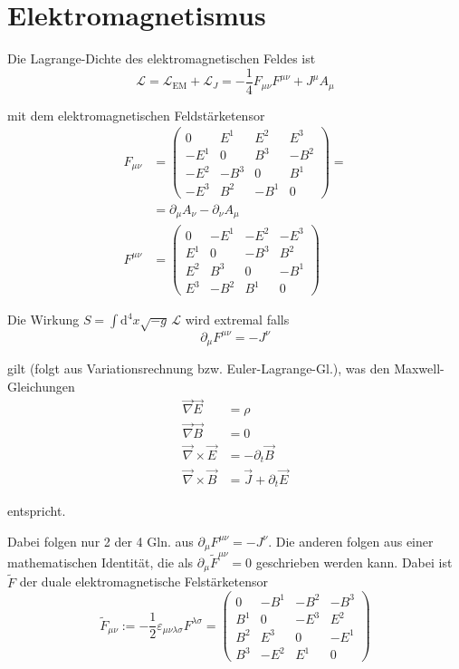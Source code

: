 \documentclass{article}
\newcommand{\diff}{\mathrm{d}}
\begin{document}
\newpage


\section{Elektromagnetismus}
Die Lagrange-Dichte des elektromagnetischen Feldes ist
	\begin{equation}
		\mathcal{L} = \mathcal{L}_\text{EM} + \mathcal{L}_J = -\frac{1}{4} F_{\mu\nu}F^{\mu\nu} + J^\mu A_\mu
	\end{equation}

mit dem elektromagnetischen Feldstärketensor
	\begin{align}
		F_{\mu\nu} &= 
		\begin{pmatrix}
			0 & E^1 & E^2 & E^3 \\
			-E^1 & 0 & B^3 & -B^2 \\
			-E^2 & -B^3 & 0 & B^1 \\
			-E^3 & B^2 & -B^1 & 0
		\end{pmatrix} = \\
		&= \partial_\mu A_\nu - \partial_\nu A_\mu \\
		F^{\mu\nu} &= 
		\begin{pmatrix}
			0 & -E^1 & -E^2 & -E^3 \\
			E^1 & 0 & -B^3 & B^2 \\
			E^2 & B^3 & 0 & -B^1 \\
			E^3 & -B^2 & B^1 & 0
		\end{pmatrix}
	\end{align}

Die Wirkung $S = \int \diff^4 x \sqrt{-g}\, \mathcal{L}$ wird extremal falls
	\begin{equation}
		\partial_\mu F^{\mu\nu} = -J^\nu
	\end{equation}

gilt \textcolor{gruen}{(folgt aus Variationsrechnung bzw. Euler-Lagrange-Gl.)}, was den Maxwell-Gleichungen
	\begin{align}
		\vec{\nabla} \vec{E} &= \rho \\
		\vec{\nabla} \vec{B} &= 0 \\
		\vec{\nabla} \times \vec{E} &= -\partial_t \vec{B} \\
		\vec{\nabla} \times \vec{B} &= \vec{J} + \partial_t \vec{E}
	\end{align}

entspricht. {\color{gruen}Dabei folgen nur 2 der 4 Gln. aus $\partial_\mu F^{\mu\nu} = -J^\nu$. Die anderen folgen aus einer mathematischen Identität, die als $\partial_\mu \tilde{F}^{\mu\nu} = 0$ geschrieben werden kann. Dabei ist $\tilde{F}$ der duale elektromagnetische Felstärketensor
	\begin{equation}
		\tilde{F}_{\mu\nu} := -\frac{1}{2}\varepsilon_{\mu\nu\lambda\sigma} F^{\lambda\sigma} =
		\begin{pmatrix}
			0 & -B^1 & -B^2 & -B^3 \\
			B^1 & 0 & -E^3 & E^2 \\
			B^2 & E^3 & 0 & -E^1 \\
			B^3 & -E^2 & E^1 & 0
		\end{pmatrix}
	\end{equation}

}
\end{document}
